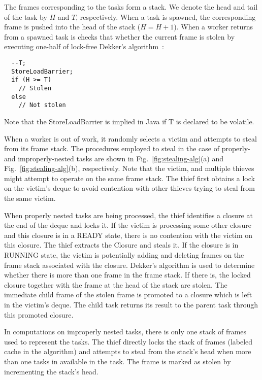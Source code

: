 The frames corresponding to the tasks form a stack. We denote the head
and tail of the task by $H$ and $T$, respectively. When a task is
spawned, the corresponding frame is pushed into the head of the stack
($H=H+1$). When a worker returns from a spawned task is checks that
whether the current frame is stolen by executing one-half of lock-free
Dekker's algorithm~\cite{dekker}:

{\scriptsize
\begin{verbatim}
  --T; 
  StoreLoadBarrier;
  if (H >= T) 
    // Stolen 
  else 
    // Not stolen
\end{verbatim}
}

Note that the {\java StoreLoadBarrier} is implied in Java if
{\java T} is declared to be {\java volatile}.

When a worker is out of work, it randomly selects a victim and
attempts to steal from its frame stack. The procedures employed to
steal in the case of properly- and improperly-nested tasks are shown
in Fig.~\ref{fig:stealing-alg}(a) and Fig.~\ref{fig:stealing-alg}(b),
respectively. Note that the victim, and multiple thieves might attempt
to operate on the same frame stack. The thief first obtains a lock on
the victim's deque to avoid contention with other thieves trying to
steal from the same victim.

When properly nested tasks are being processed, the thief identifies a
closure at the end of the deque and locks it. If the victim is
processing some other closure and this closure is in a {\java READY}
state, there is no contention with the victim on this closure. The
thief extracts the Closure and steals it. If the closure is in
{\java RUNNING} state, the victim is potentially adding and deleting
frames on the frame stack associated with the closure. Dekker's
algorithm is used to determine whether there is more than one frame in
the frame stack. If there is, the locked closure together with the
frame at the head of the stack are stolen. The immediate child frame
of the stolen frame is promoted to a closure which is left in the
victim's deque. The child task returns its result to the parent task
through this promoted closure.

In computations on improperly nested tasks, there is only one stack of
frames used to represent the tasks. The thief directly locks the stack
of frames (labeled {\java cache} in the algorithm) and attempts to
steal from the stack's head when more than one tasks in available in
the task. The frame is marked as stolen by incrementing the stack's
head. 

